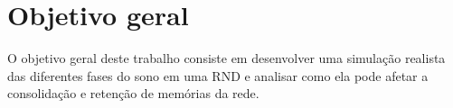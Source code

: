 \section{Objetivo geral}

O objetivo geral deste trabalho consiste em desenvolver uma simulação realista das diferentes fases do sono em uma RND e analisar
como ela pode afetar a consolidação e retenção de memórias da rede.
